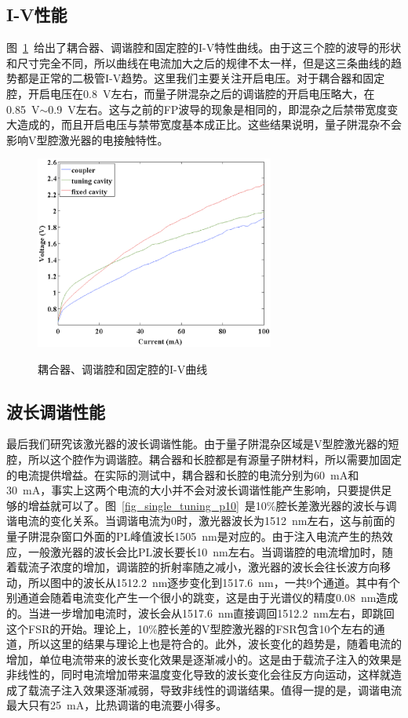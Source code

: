\documentclass{ZJUthesis}
\begin{document}
\subsection{I-V性能}

图~\ref{fig_single_iv}~给出了耦合器、调谐腔和固定腔的I-V特性曲线。由于这三个腔的波导的形状和尺寸完全不同，所以曲线在电流加大之后的规律不太一样，但是这三条曲线的趋势都是正常的二极管I-V趋势。这里我们主要关注开启电压。对于耦合器和固定腔，开启电压在0.8~V左右，而量子阱混杂之后的调谐腔的开启电压略大，在0.85~V$\sim$0.9~V左右。这与之前的FP波导的现象是相同的，即混杂之后禁带宽度变大造成的，而且开启电压与禁带宽度基本成正比。这些结果说明，量子阱混杂不会影响V型腔激光器的电接触特性。

\begin{figure}[htbp]
  \centering
  \includegraphics[width=0.7\textwidth]{./Pictures/single_iv.eps}\\
  \caption{耦合器、调谐腔和固定腔的I-V曲线}
  \label{fig_single_iv}
\end{figure}

\subsection{波长调谐性能}

最后我们研究该激光器的波长调谐性能。由于量子阱混杂区域是V型腔激光器的短腔，所以这个腔作为调谐腔。耦合器和长腔都是有源量子阱材料，所以需要加固定的电流提供增益。在实际的测试中，耦合器和长腔的电流分别为60~mA和30~mA，事实上这两个电流的大小并不会对波长调谐性能产生影响，只要提供足够的增益就可以了。图~\ref{fig_single_tuning_p10}~是10\%腔长差激光器的波长与调谐电流的变化关系。当调谐电流为0时，激光器波长为1512~nm左右，这与前面的量子阱混杂窗口外面的PL峰值波长1505~nm是对应的。由于注入电流产生的热效应，一般激光器的波长会比PL波长要长10~nm左右。当调谐腔的电流增加时，随着载流子浓度的增加，调谐腔的折射率随之减小，激光器的波长会往长波方向移动，所以图中的波长从1512.2~nm逐步变化到1517.6~nm，一共9个通道。其中有个别通道会随着电流变化产生一个很小的跳变，这是由于光谱仪的精度0.08~nm造成的。当进一步增加电流时，波长会从1517.6~nm直接调回1512.2~nm左右，即跳回这个FSR的开始。理论上，10\%腔长差的V型腔激光器的FSR包含10个左右的通道，所以这里的结果与理论上也是符合的。此外，波长变化的趋势是，随着电流的增加，单位电流带来的波长变化效果是逐渐减小的。这是由于载流子注入的效果是非线性的，同时电流增加带来温度变化导致的波长变化会往反方向运动，这样就造成了载流子注入效果逐渐减弱，导致非线性的调谐结果。值得一提的是，调谐电流最大只有25~mA，比热调谐的电流要小得多。
\end{document}
